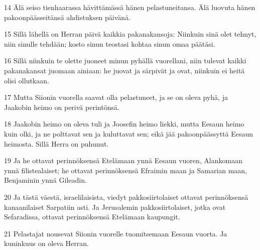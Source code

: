 \par 14 Älä seiso tienhaarassa hävittämässä hänen pelastuneitansa. Älä luovuta hänen pakoonpäässeitänsä ahdistuksen päivänä.
\par 15 Sillä lähellä on Herran päivä kaikkia pakanakansoja: Niinkuin sinä olet tehnyt, niin sinulle tehdään; kosto sinun teostasi kohtaa sinun omaa päätäsi.
\par 16 Sillä niinkuin te olette juoneet minun pyhällä vuorellani, niin tulevat kaikki pakanakansat juomaan ainiaan: he juovat ja särpivät ja ovat, niinkuin ei heitä olisi ollutkaan.
\par 17 Mutta Siionin vuorella saavat olla pelastuneet, ja se on oleva pyhä, ja Jaakobin heimo on perivä perintönsä.
\par 18 Jaakobin heimo on oleva tuli ja Joosefin heimo liekki, mutta Eesaun heimo kuin olki, ja ne polttavat sen ja kuluttavat sen; eikä jää pakoonpäässyttä Eesaun heimosta. Sillä Herra on puhunut.
\par 19 Ja he ottavat perinnöksensä Etelämaan ynnä Eesaun vuoren, Alankomaan ynnä filistealaiset; he ottavat perinnöksensä Efraimin maan ja Samarian maan, Benjaminin ynnä Gileadin.
\par 20 Ja tästä väestä, israelilaisista, viedyt pakkosiirtolaiset ottavat perinnöksensä kanaanilaiset Sarpatiin asti. Ja Jerusalemin pakkosiirtolaiset, jotka ovat Sefaradissa, ottavat perinnöksensä Etelämaan kaupungit.
\par 21 Pelastajat nousevat Siionin vuorelle tuomitsemaan Eesaun vuorta. Ja kuninkuus on oleva Herran.


